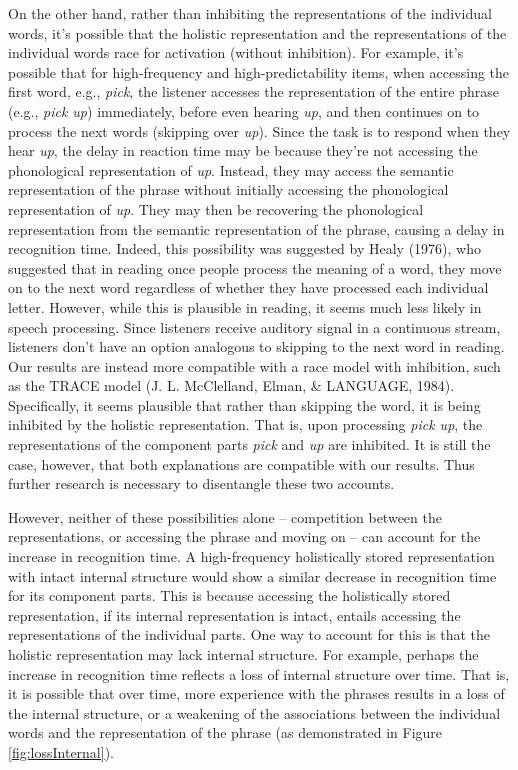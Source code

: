 \documentclass[
  man,floatsintext]{apa6}
\begin{document}
On the other hand, rather than inhibiting the representations of the individual words, it's possible that the holistic representation and the representations of the individual words race for activation (without inhibition). For example, it's possible that for high-frequency and high-predictability items, when accessing the first word, e.g., \emph{pick}, the listener accesses the representation of the entire phrase (e.g., \emph{pick up}) immediately, before even hearing \emph{up}, and then continues on to process the next words (skipping over \emph{up}). Since the task is to respond when they hear \emph{up}, the delay in reaction time may be because they're not accessing the phonological representation of \emph{up}. Instead, they may access the semantic representation of the phrase without initially accessing the phonological representation of \emph{up}. They may then be recovering the phonological representation from the semantic representation of the phrase, causing a delay in recognition time. Indeed, this possibility was suggested by Healy (1976), who suggested that in reading once people process the meaning of a word, they move on to the next word regardless of whether they have processed each individual letter. However, while this is plausible in reading, it seems much less likely in speech processing. Since listeners receive auditory signal in a continuous stream, listeners don't have an option analogous to skipping to the next word in reading. Our results are instead more compatible with a race model with inhibition, such as the TRACE model (J. L. McClelland, Elman, \& LANGUAGE, 1984). Specifically, it seems plausible that rather than skipping the word, it is being inhibited by the holistic representation. That is, upon processing \emph{pick up}, the representations of the component parts \emph{pick} and \emph{up} are inhibited. It is still the case, however, that both explanations are compatible with our results. Thus further research is necessary to disentangle these two accounts.

However, neither of these possibilities alone -- competition between the representations, or accessing the phrase and moving on -- can account for the increase in recognition time. A high-frequency holistically stored representation with intact internal structure would show a similar decrease in recognition time for its component parts. This is because accessing the holistically stored representation, if its internal representation is intact, entails accessing the representations of the individual parts. One way to account for this is that the holistic representation may lack internal structure. For example, perhaps the increase in recognition time reflects a loss of internal structure over time. That is, it is possible that over time, more experience with the phrases results in a loss of the internal structure, or a weakening of the associations between the individual words and the representation of the phrase (as demonstrated in Figure \ref{fig:lossInternal}).
\end{document}
